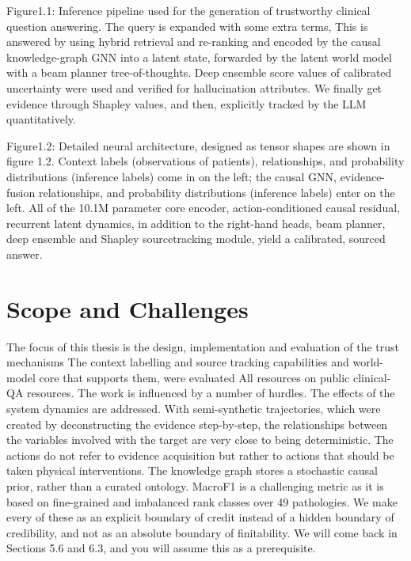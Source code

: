 Figure1.1: Inference pipeline used for the generation of trustworthy
clinical question answering. The query is expanded with some extra
terms, This is answered by using hybrid retrieval and re-ranking and
encoded by the causal knowledge-graph GNN into a latent state, forwarded
by the latent world model with a beam planner tree-of-thoughts. Deep
ensemble score values of calibrated uncertainty were used and verified
for hallucination attributes. We finally get evidence through Shapley
values, and then, explicitly tracked by the LLM quantitatively.

Figure1.2: Detailed neural architecture, designed as tensor shapes are
shown in figure 1.2. Context labels (observations of patients),
relationships, and probability distributions (inference labels) come in
on the left; the causal GNN, evidence-fusion relationships, and
probability distributions (inference labels) enter on the left. All of
the 10.1M parameter core encoder, action-conditioned causal residual,
recurrent latent dynamics, in addition to the right-hand heads, beam
planner, deep ensemble and Shapley sourcetracking module, yield a
calibrated, sourced answer.

\section{Scope and Challenges}\label{scope-and-challenges}

The focus of this thesis is the design, implementation and evaluation of
the trust mechanisms The context labelling and source tracking
capabilities and world-model core that supports them, were evaluated All
resources on public clinical-QA resources. The work is influenced by a
number of hurdles. The effects of the system dynamics are addressed.
With semi-synthetic trajectories, which were created by deconstructing
the evidence step-by-step, the relationships between the variables
involved with the target are very close to being deterministic. The
actions do not refer to evidence acquisition but rather to actions that
should be taken physical interventions. The knowledge graph stores a
stochastic causal prior, rather than a curated ontology. MacroF1 is a
challenging metric as it is based on fine-grained and imbalanced rank
classes over 49 pathologies. We make every of these as an explicit
boundary of credit instead of a hidden boundary of credibility, and not
as an absolute boundary of finitability. We will come back in Sections
5.6 and 6.3, and you will assume this as a prerequisite.
